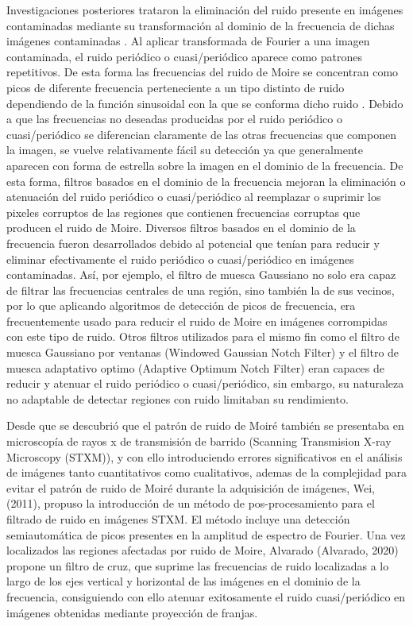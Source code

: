 \documentclass[10pt,letterpaper]{article}
\begin{document}
Investigaciones posteriores trataron la eliminación del ruido presente en imágenes contaminadas mediante su transformación al dominio de la frecuencia de dichas imágenes contaminadas \cite{Atul:}. Al aplicar transformada de Fourier a una imagen contaminada, el ruido periódico o cuasi/periódico aparece como patrones repetitivos. De esta forma las frecuencias del ruido de Moire se concentran como picos de diferente frecuencia perteneciente a un tipo distinto de ruido dependiendo de la función sinusoidal con la que se conforma dicho ruido \cite{Srin:Cann}. Debido a que las frecuencias no deseadas producidas por el ruido periódico o cuasi/periódico se diferencian claramente de las otras frecuencias que componen la imagen, se vuelve relativamente fácil su detección ya que generalmente aparecen con forma de estrella sobre la imagen en el dominio de la frecuencia. De esta forma, filtros basados en el dominio de la frecuencia mejoran la eliminación o atenuación del ruido periódico o cuasi/periódico al reemplazar o suprimir los pixeles corruptos de las regiones que contienen frecuencias corruptas que producen el ruido de Moire\cite{Lebr:Colo}\cite{Mila:}. Diversos filtros basados en el dominio de la frecuencia fueron desarrollados debido al potencial que tenían para reducir y eliminar efectivamente el ruido periódico o cuasi/periódico en imágenes contaminadas. Así, por ejemplo, el filtro de muesca Gaussiano no solo era capaz de filtrar las frecuencias centrales de una región, sino también la de sus vecinos, por lo que aplicando algoritmos de detección de picos de frecuencia, era frecuentemente usado para reducir el ruido de Moire en imágenes corrompidas con este tipo de ruido\cite{Gonz:Rich}. Otros filtros utilizados para el mismo fin como el filtro de muesca Gaussiano por ventanas (Windowed Gaussian Notch Filter)\cite{Aize:Buta} y el filtro de muesca adaptativo optimo (Adaptive Optimum Notch Filter) eran capaces de reducir y atenuar el ruido periódico o cuasi/periódico, sin embargo, su naturaleza no adaptable de detectar regiones con ruido limitaban su rendimiento\cite{Paym:Maso}. %

Desde que se descubrió que el patrón de ruido de Moiré también se presentaba en microscopía de rayos x de transmisión de barrido (Scanning Transmision X-ray Microscopy (STXM)), y con ello introduciendo errores significativos en el análisis de imágenes tanto cuantitativos como cualitativos, ademas de la complejidad para evitar el patrón de ruido de Moiré durante la adquisición de imágenes,  Wei, (2011), propuso la introducción de un método de  pos-procesamiento para el filtrado de ruido en imágenes STXM. El método incluye una detección semiautomática de picos presentes en la amplitud de espectro de Fourier\cite{Wei:Wang}. Una vez localizados las regiones afectadas por ruido de Moire, Alvarado (Alvarado, 2020) propone un filtro de cruz, que suprime las frecuencias de ruido localizadas a lo largo de los ejes vertical y horizontal de las imágenes en el dominio de la frecuencia, consiguiendo con ello atenuar exitosamente el ruido cuasi/periódico en imágenes obtenidas mediante proyección de franjas\cite{Alva:Orte}. %
\end{document}
